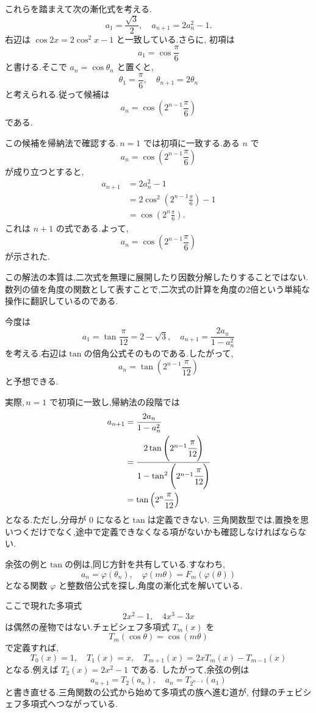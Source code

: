 これらを踏まえて次の漸化式を考える.
\[
  a_1=\frac{\sqrt{3}}{2},\quad a_{n+1}=2a_n^2-1.
\]
右辺は $\cos 2x=2\cos^2x-1$ と一致している.さらに,
初項は
\[
  a_1=\cos\frac{\pi}{6}
\]
と書ける.そこで $a_n=\cos\theta_n$ と置くと,
\[
  \theta_1=\frac{\pi}{6},
  \quad
  \theta_{n+1}=2\theta_n
\]
と考えられる.従って候補は
\[
  a_n=\cos\left(2^{n-1}\frac{\pi}{6}\right)
\]
である.

この候補を帰納法で確認する.\,$n=1$ では初項に一致する.ある $n$ で
\[
  a_n=\cos\left(2^{n-1}\frac{\pi}{6}\right)
\]
が成り立つとすると,
\begin{align*}
  a_{n+1}
    &=2a_n^2-1\\
    &=2\cos^2\left(2^{n-1}\frac{\pi}{6}\right)-1\\
    &=\cos\left(2^n\frac{\pi}{6}\right).
\end{align*}
これは $n+1$ の式である.よって,
\[
  a_n=\cos\left(2^{n-1}\frac{\pi}{6}\right)
\]
が示された.

この解法の本質は,二次式を無理に展開したり因数分解したりすることではない.
数列の値を角度の関数として表すことで,二次式の計算を角度の2倍という単純な操作に翻訳しているのである.

今度は
\[
  a_1=\tan\frac{\pi}{12}=2-\sqrt{3},
  \quad
  a_{n+1}=\frac{2a_n}{1-a_n^2}
\]
を考える.右辺は$\tan$の倍角公式そのものである.したがって,
\[
  a_n=\tan\left(2^{n-1}\frac{\pi}{12}\right)
\]
と予想できる.

実際,\,$n=1$ で初項に一致し,帰納法の段階では
\begin{align*}
  a_{n+1}
    &=\frac{2a_n}{1-a_n^2}\\
    &=\cfrac{2\tan\left(2^{n-1}\cfrac{\pi}{12}\right)}
            {1-\tan^2\left(2^{n-1}\cfrac{\pi}{12}\right)}\\
    &=\tan\left(2^n\frac{\pi}{12}\right)
\end{align*}
となる.ただし,分母が $0$ になると$\tan$は定義できない.
三角関数型では,置換を思いつくだけでなく,途中で定義できなくなる項がないかも確認しなければならない.

余弦の例と$\tan$の例は,同じ方針を共有している.すなわち,
\[
  a_n=\varphi(\theta_n),
  \quad
  \varphi(m\theta)=F_m(\varphi(\theta))
\]
となる関数 $\varphi$ と整数倍公式を探し,角度の漸化式を解いている.

ここで現れた多項式
\[
  2x^2-1,
  \quad
  4x^3-3x
\]
は偶然の産物ではない.チェビシェフ多項式 $T_m(x)$ を
\[
  T_m(\cos\theta)=\cos(m\theta)
\]
で定義すれば,
\[
  T_0(x)=1,
  \quad
  T_1(x)=x,
  \quad
  T_{m+1}(x)=2xT_m(x)-T_{m-1}(x)
\]
となる.例えば $T_2(x)=2x^2-1$ である.
したがって,余弦の例は
\[
  a_{n+1}=T_2(a_n),
  \quad
  a_n=T_{2^{n-1}}(a_1)
\]
と書き直せる.三角関数の公式から始めて多項式の族へ進む道が,
付録のチェビシェフ多項式へつながっている.


